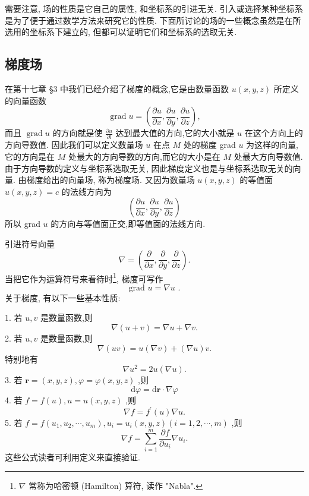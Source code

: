 需要注意, 场的性质是它自己的属性, 和坐标系的引进无关. 引入或选择某种坐标系是为了便于通过数学方法来研究它的性质. 下面所讨论的场的一些概念虽然是在所选用的坐标系下建立的, 但都可以证明它们和坐标系的选取无关.

\subsection{梯度场}

在第十七章 §3 中我们已经介绍了梯度的概念,它是由数量函数 \(u\left( {x,y,z}\right)\) 所定义的向量函数
\[
\operatorname{grad}u = \left( {\frac{\partial u}{\partial x},\frac{\partial u}{\partial y},\frac{\partial u}{\partial z}}\right) ,
\]
而且 \(\operatorname{grad}u\) 的方向就是使 \(\frac{\partial u}{\partial l}\) 达到最大值的方向,它的大小就是 \(u\) 在这个方向上的方向导数值. 因此我们可以定义数量场 \(u\) 在点 \(M\) 处的梯度 grad \(u\) 为这样的向量,它的方向是在 \(M\) 处最大的方向导数的方向,而它的大小是在 \(M\) 处最大方向导数值. 由于方向导数的定义与坐标系选取无关, 因此梯度定义也是与坐标系选取无关的向量. 由梯度给出的向量场, 称为梯度场. 又因为数量场 \(u\left( {x,y,z}\right)\) 的等值面 \(u\left( {x,y,z}\right)  = c\) 的法线方向为
\[
\left( {\frac{\partial u}{\partial x},\frac{\partial u}{\partial y},\frac{\partial u}{\partial z}}\right)
\]
所以 grad \(u\) 的方向与等值面正交,即等值面的法线方向.

引进符号向量
\[
\nabla  = \left( {\frac{\partial }{\partial x},\frac{\partial }{\partial y},\frac{\partial }{\partial z}}\right) .
\]
当把它作为运算符号来看待时\footnote{\(\nabla\) 常称为哈密顿 (Hamilton) 算符, 读作 "Nabla".}, 梯度可写作
\[
\text{ grad }u = \nabla u\text{ . }
\]
关于梯度, 有以下一些基本性质:

1. 若 \(u,v\) 是数量函数,则
\[
\nabla \left( {u + v}\right)  = \nabla u + \nabla v.
\]
2. 若 \(u,v\) 是数量函数,则
\[
\nabla \left( {uv}\right)  = u\left( {\nabla v}\right)  + \left( {\nabla u}\right) v.
\]
特别地有
\[
\nabla {u}^{2} = {2u}\left( {\nabla u}\right) .
\]
3. 若 \(\mathbf{r} = \left( {x,y,z}\right) ,\varphi  = \varphi \left( {x,y,z}\right)\) ,则
\[
\mathrm{d}\varphi  = \mathrm{d}\mathbf{r} \cdot  \nabla \varphi
\]
4. 若 \(f = f\left( u\right) ,u = u\left( {x,y,z}\right)\) ,则
\[
\nabla f = {f}^{\prime }\left( u\right) \nabla u.
\]
5. 若 \(f = f\left( {{u}_{1},{u}_{2},\cdots ,{u}_{m}}\right) ,{u}_{i} = {u}_{i}\left( {x,y,z}\right) \left( {i = 1,2,\cdots ,m}\right)\) ,则
\[
\nabla f = \mathop{\sum }\limits_{{i = 1}}^{m}\frac{\partial f}{\partial {u}_{i}}\nabla {u}_{i}.
\]
这些公式读者可利用定义来直接验证.

